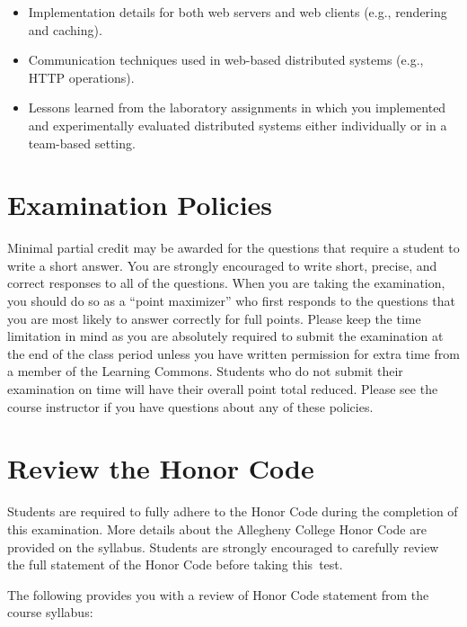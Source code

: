 \begin{itemize}
  \item Implementation details for both web servers and web clients (e.g., rendering and caching).

  \item Communication techniques used in web-based distributed systems (e.g., HTTP operations).

  \item Lessons learned from the laboratory assignments in which you implemented and experimentally evaluated
    distributed systems either individually or in a team-based setting.


\end{itemize}

\vspace*{-.05in}
\section*{Examination Policies}

\vspace*{-.05in}
\noindent Minimal partial credit may be awarded for the questions that require a student to write a short answer. You
are strongly encouraged to write short, precise, and correct responses to all of the questions. When you are taking the
examination, you should do so as a ``point maximizer'' who first responds to the questions that you are most likely to
answer correctly for full points. Please keep the time limitation in mind as you are absolutely required to submit the
examination at the end of the class period unless you have written permission for extra time from a member of the
Learning Commons. Students who do not submit their examination on time will have their overall point total reduced.
Please see the course instructor if you have questions about any of these policies.

\vspace*{-.2in}
\section*{Review the Honor Code}
\vspace*{-.1in}

\noindent Students are required to fully adhere to the Honor Code during the completion of this examination. More
details about the Allegheny College Honor Code are provided on the syllabus. Students are strongly encouraged to
carefully review the full statement of the Honor Code before taking \mbox{this test}.

\noindent The following provides you with a review of Honor Code statement from the course syllabus:

